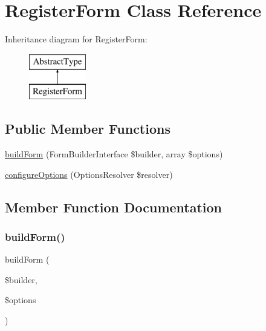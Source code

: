 \hypertarget{class_app_1_1_forms_1_1_register_form}{}\section{Register\+Form Class Reference}
\label{class_app_1_1_forms_1_1_register_form}
Inheritance diagram for Register\+Form\+:\begin{figure}[H]
\begin{center}
\leavevmode
\includegraphics[height=2.000000cm]{class_app_1_1_forms_1_1_register_form}
\end{center}
\end{figure}
\subsection*{Public Member Functions}
\begin{DoxyCompactItemize}
\item 
\mbox{\hyperlink{class_app_1_1_forms_1_1_register_form_a83c3745710374f9c5a1eb0686fe2dfab}{build\+Form}} (Form\+Builder\+Interface \$builder, array \$options)
\item 
\mbox{\hyperlink{class_app_1_1_forms_1_1_register_form_a8ff68a86f5090b5df973286836e46ead}{configure\+Options}} (Options\+Resolver \$resolver)
\end{DoxyCompactItemize}


\subsection{Member Function Documentation}
\mbox{\label{class_app_1_1_forms_1_1_register_form_a83c3745710374f9c5a1eb0686fe2dfab}} 
\subsubsection{\texorpdfstring{buildForm()}{buildForm()}}
{\footnotesize\ttfamily build\+Form (\begin{DoxyParamCaption}\item[{Form\+Builder\+Interface}]{\$builder,  }\item[{array}]{\$options }\end{DoxyParamCaption})}


